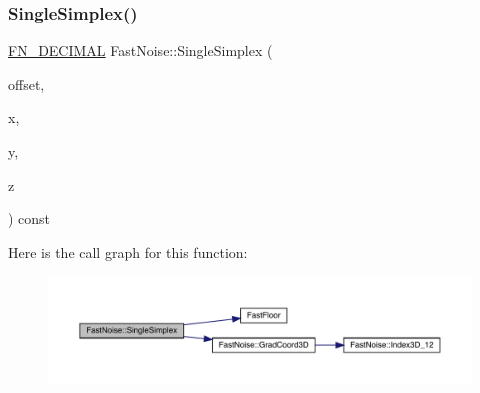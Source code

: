 \subsubsection{\texorpdfstring{Single\+Simplex()}{SingleSimplex()}\hspace{0.1cm}{\footnotesize\ttfamily [2/3]}}
{\footnotesize\ttfamily \mbox{\hyperlink{_fast_noise_8h_a75a9ef6d2541c4921815b885bfd449c3}{F\+N\+\_\+\+D\+E\+C\+I\+M\+AL}} Fast\+Noise\+::\+Single\+Simplex (\begin{DoxyParamCaption}\item[{unsigned char}]{offset,  }\item[{\mbox{\hyperlink{_fast_noise_8h_a75a9ef6d2541c4921815b885bfd449c3}{F\+N\+\_\+\+D\+E\+C\+I\+M\+AL}}}]{x,  }\item[{\mbox{\hyperlink{_fast_noise_8h_a75a9ef6d2541c4921815b885bfd449c3}{F\+N\+\_\+\+D\+E\+C\+I\+M\+AL}}}]{y,  }\item[{\mbox{\hyperlink{_fast_noise_8h_a75a9ef6d2541c4921815b885bfd449c3}{F\+N\+\_\+\+D\+E\+C\+I\+M\+AL}}}]{z }\end{DoxyParamCaption}) const\hspace{0.3cm}{\ttfamily [private]}}

Here is the call graph for this function\+:
\nopagebreak
\begin{figure}[H]
\begin{center}
\leavevmode
\includegraphics[width=350pt]{d1/dd8/class_fast_noise_a5e40c643992d4099dbe7f0a5be6460e7_cgraph}
\end{center}
\end{figure}
\mbox{\label{class_fast_noise_a1f05efc093f8c7998014dfc3b77e0753}} 
